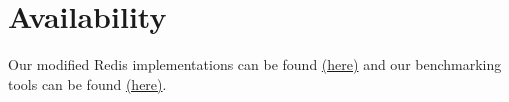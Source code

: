 \documentclass[sigconf, screen]{acmart}
\begin{document}
\section{Availability}

Our modified Redis implementations can be found \href{https://github.com/bryantcurto/redis/compare/6.2..io-threading-update}{(here)} and our benchmarking tools can be found \href{https://github.com/bryantcurto/redis/compare/6.2..io-threading-update-benchmark}{(here)}.




\end{document}
